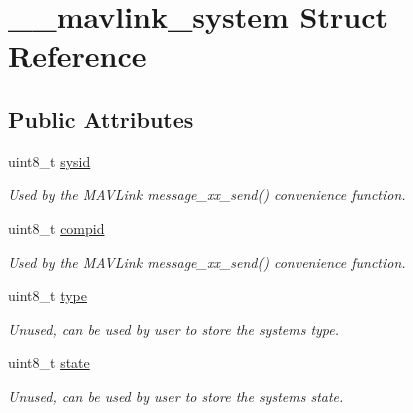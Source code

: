 \hypertarget{struct____mavlink__system}{}\section{\+\_\+\+\_\+mavlink\+\_\+system Struct Reference}
\label{struct____mavlink__system}
\subsection*{Public Attributes}
\begin{DoxyCompactItemize}
\item 
\mbox{\label{struct____mavlink__system_a3533dcc52fcacb13bb3190ae847e8260}} 
uint8\+\_\+t \hyperlink{struct____mavlink__system_a3533dcc52fcacb13bb3190ae847e8260}{sysid}
\begin{DoxyCompactList}\small\item\em Used by the M\+A\+V\+Link message\+\_\+xx\+\_\+send() convenience function. \end{DoxyCompactList}\item 
\mbox{\label{struct____mavlink__system_a1aec3b4f214beea3276a214c7498cb0f}} 
uint8\+\_\+t \hyperlink{struct____mavlink__system_a1aec3b4f214beea3276a214c7498cb0f}{compid}
\begin{DoxyCompactList}\small\item\em Used by the M\+A\+V\+Link message\+\_\+xx\+\_\+send() convenience function. \end{DoxyCompactList}\item 
\mbox{\label{struct____mavlink__system_aab94b93e251cac8de298a0ff90c41b8f}} 
uint8\+\_\+t \hyperlink{struct____mavlink__system_aab94b93e251cac8de298a0ff90c41b8f}{type}
\begin{DoxyCompactList}\small\item\em Unused, can be used by user to store the system\textquotesingle{}s type. \end{DoxyCompactList}\item 
\mbox{\label{struct____mavlink__system_ac5afa4a95067ba7b21d4884a740cc413}} 
uint8\+\_\+t \hyperlink{struct____mavlink__system_ac5afa4a95067ba7b21d4884a740cc413}{state}
\begin{DoxyCompactList}\small\item\em Unused, can be used by user to store the system\textquotesingle{}s state. \end{DoxyCompactList}\item 

\end{DoxyCompactItemize}
